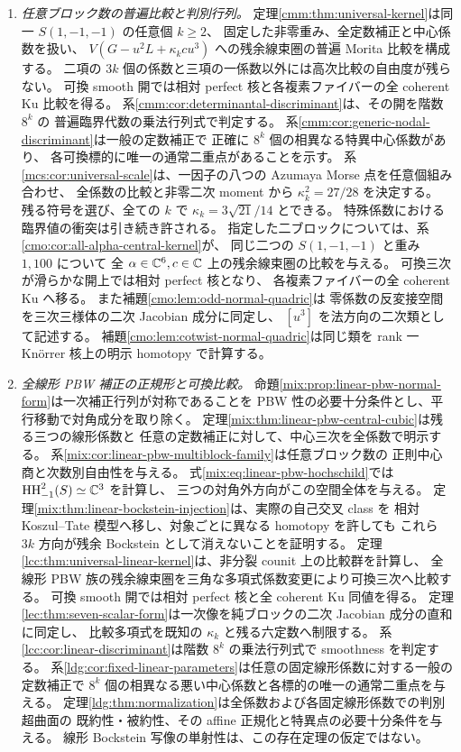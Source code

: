 \begin{enumerate}
 \item \emph{任意ブロック数の普遍比較と判別行列。}
 定理\ref{cmm:thm:universal-kernel}は同一 $S(1,-1,-1)$ の任意個 $k\ge2$、
 固定した非零重み、全定数補正と中心係数を扱い、
 $V(G-u^2L+\kappa_kcu^3)$ への残余線束圏の普遍 Morita 比較を構成する。
 二項の $3k$ 個の係数と三項の一係数以外には高次比較の自由度が残らない。
 可換 smooth 開では相対 perfect 核と各複素ファイバーの全 coherent Ku 比較を得る。
 系\ref{cmm:cor:determinantal-discriminant}は、その開を階数 $8^k$ の
 普遍臨界代数の乗法行列式で判定する。
 系\ref{cmm:cor:generic-nodal-discriminant}は一般の定数補正で
 正確に $8^k$ 個の相異なる特異中心係数があり、
 各可換標的に唯一の通常二重点があることを示す。
 系\ref{mcs:cor:universal-scale}は、一因子の八つの Azumaya Morse 点を任意個組み合わせ、
 全係数の比較と非零二次 moment から $\kappa_k^2=27/28$ を決定する。
 残る符号を選び、全ての $k$ で $\kappa_k=3\sqrt{21}/14$ とできる。
 特殊係数における臨界値の衝突は引き続き許される。
 指定した二ブロックについては、系\ref{cmo:cor:all-alpha-central-kernel}が、
 同じ二つの $S(1,-1,-1)$ と重み $1,100$ について
 全 $\alpha\in\mathbb C^6,c\in\mathbb C$ 上の残余線束圏の比較を与える。
 可換三次が滑らかな開上では相対 perfect 核となり、
 各複素ファイバーの全 coherent Ku へ移る。
 また補題\ref{cmo:lem:odd-normal-quadric}は
 零係数の反変接空間を三次三様体の二次 Jacobian 成分に同定し、
 $[u^3]$ を法方向の二次類として記述する。
 補題\ref{cmo:lem:cotwist-normal-quadric}は同じ類を
 rank 一 Kn\"orrer 核上の明示 homotopy で計算する。

 \item \emph{全線形 PBW 補正の正規形と可換比較。}
 命題\ref{mix:prop:linear-pbw-normal-form}は一次補正行列が対称であることを
 PBW 性の必要十分条件とし、平行移動で対角成分を取り除く。
 定理\ref{mix:thm:linear-pbw-central-cubic}は残る三つの線形係数と
 任意の定数補正に対して、中心三次を全係数で明示する。
 系\ref{mix:cor:linear-pbw-multiblock-family}は任意ブロック数の
 正則中心商と次数別自由性を与える。
 式\eqref{mix:eq:linear-pbw-hochschild}では
 $\operatorname{HH}^2_{-1}(S)\simeq\mathbb C^3$ を計算し、
 三つの対角外方向がこの空間全体を与える。
 定理\ref{mix:thm:linear-bockstein-injection}は、実際の自己交叉 class を
 相対 Koszul--Tate 模型へ移し、対象ごとに異なる homotopy を許しても
 これら $3k$ 方向が残余 Bockstein として消えないことを証明する。
 定理\ref{lcc:thm:universal-linear-kernel}は、非分裂 counit 上の比較群を計算し、
 全線形 PBW 族の残余線束圏を三角な多項式係数変更により可換三次へ比較する。
 可換 smooth 開では相対 perfect 核と全 coherent Ku 同値を得る。
 定理\ref{lec:thm:seven-scalar-form}は一次像を純ブロックの二次 Jacobian 成分の直和に同定し、
 比較多項式を既知の $\kappa_k$ と残る六定数へ制限する。
 系\ref{lcc:cor:linear-discriminant}は階数 $8^k$ の乗法行列式で smoothness を判定する。
 系\ref{ldg:cor:fixed-linear-parameters}は任意の固定線形係数に対する一般の定数補正で
 $8^k$ 個の相異なる悪い中心係数と各標的の唯一の通常二重点を与える。
 定理\ref{ldg:thm:normalization}は全係数および各固定線形係数での判別超曲面の
 既約性・被約性、その affine 正規化と特異点の必要十分条件を与える。
 線形 Bockstein 写像の単射性は、この存在定理の仮定ではない。


\end{enumerate}
